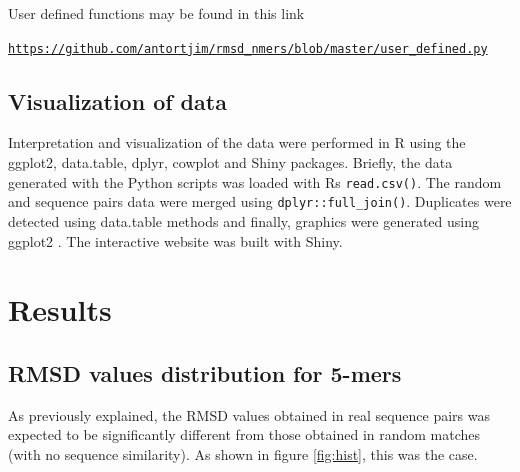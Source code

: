 \documentclass[a4paper, 11pt]{article} %
\begin{document}
User defined functions may be found in this link

\begin{center}
\texttt{\href{https://github.com/antortjim/rmsd\_nmers/blob/master/user\_defined.py}{https://github.com/antortjim/rmsd\_nmers/blob/master/user\_defined.py}}
\end{center}

\subsection{Visualization of data}

Interpretation and visualization of the data were performed in R using the ggplot2, data.table, dplyr, cowplot and Shiny \cite{shiny} packages. Briefly, the data generated with the Python scripts was loaded with R\textquotesingle s \texttt{read.csv()}. The random and sequence pairs data were merged using \texttt{dplyr::full\_join()}. Duplicates were detected using data.table methods and finally, graphics were generated using ggplot2 \cite{ggplot2}. The interactive website was built with Shiny.

\section{Results}


\subsection{RMSD values distribution for 5-mers}

As previously explained, the RMSD values obtained in real sequence pairs was expected to be significantly different from those obtained in random matches (with no sequence similarity). As shown in figure \ref{fig:hist}, this was the case. 
\end{document}
